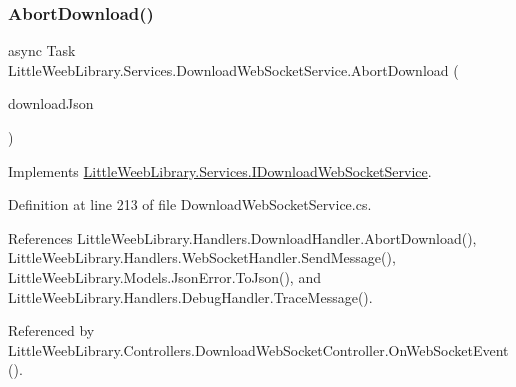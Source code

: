 \subsubsection{\texorpdfstring{Abort\+Download()}{AbortDownload()}}
{\footnotesize\ttfamily async Task Little\+Weeb\+Library.\+Services.\+Download\+Web\+Socket\+Service.\+Abort\+Download (\begin{DoxyParamCaption}\item[{J\+Object}]{download\+Json }\end{DoxyParamCaption})}



Implements \mbox{\hyperlink{interface_little_weeb_library_1_1_services_1_1_i_download_web_socket_service_a5f49ed53660e8c5253f0609e90fc839e}{Little\+Weeb\+Library.\+Services.\+I\+Download\+Web\+Socket\+Service}}.



Definition at line 213 of file Download\+Web\+Socket\+Service.\+cs.



References Little\+Weeb\+Library.\+Handlers.\+Download\+Handler.\+Abort\+Download(), Little\+Weeb\+Library.\+Handlers.\+Web\+Socket\+Handler.\+Send\+Message(), Little\+Weeb\+Library.\+Models.\+Json\+Error.\+To\+Json(), and Little\+Weeb\+Library.\+Handlers.\+Debug\+Handler.\+Trace\+Message().



Referenced by Little\+Weeb\+Library.\+Controllers.\+Download\+Web\+Socket\+Controller.\+On\+Web\+Socket\+Event().


